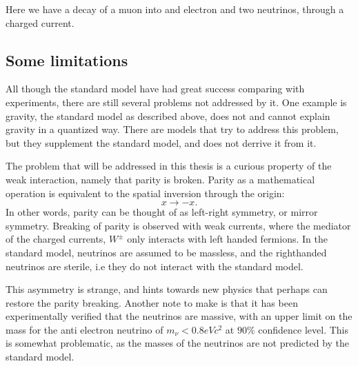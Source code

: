 Here we have a decay of a muon into and electron and two neutrinos, through a charged current. 

\subsection*{Some limitations}
All though the standard model have had great success comparing with experiments,
there are still several problems not addressed by it. One example is gravity, the standard model
as described above, does not and cannot explain gravity in a quantized way. There 
are models that try to address this problem, but they supplement the standard model,
and does not derrive it from it. \par 
The problem that will be addressed in this thesis is a curious property of the weak interaction, 
namely that parity is broken. Parity as a mathematical operation is equivalent to the spatial inversion 
through the origin\cite{Thomson:2013zua}:
\begin{equation}
    x \to -x.
\end{equation}
In other words, parity can be thought of as left-right symmetry, or mirror symmetry. Breaking of parity is observed
with weak currents, where the mediator of the charged currents, $W^{\pm}$ only interacts with 
left handed fermions. In the standard model, neutrinos are assumed to be massless, and the righthanded 
neutrinos are sterile, i.e they do not interact with the standard model. \par 
This asymmetry is strange, and hints towards new physics that perhaps can restore the parity breaking. 
Another note to make is that it has been experimentally verified that the neutrinos are massive\cite{Katrin_neutrinos},
with an upper limit on the mass for the anti electron neutrino of $m_{\nu} < 0.8eVc^2$ at $90\%$ confidence level.
This is somewhat problematic, as the masses of the neutrinos are not predicted by the standard model. 









